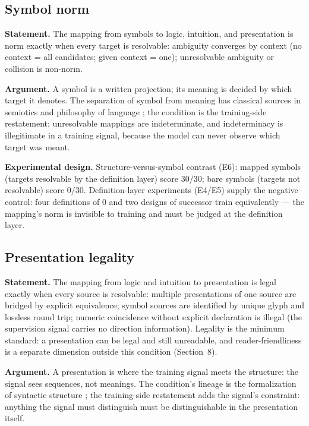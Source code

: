\documentclass{article} %
\begin{document}
\subsection{Symbol norm}

\textbf{Statement.} The mapping from symbols to logic, intuition,
and presentation is norm exactly when every target is resolvable:
ambiguity converges by context (no context = all candidates; given
context = one); unresolvable ambiguity or collision is non-norm.

\textbf{Argument.} A symbol is a written projection; its meaning is
decided by which target it denotes. The separation of symbol from
meaning has classical sources in semiotics and philosophy of
language \citep{frege1892sense, saussure1916course,
peirce1931collected, quine1960word, wittgenstein1953investigations};
the condition is the training-side restatement: unresolvable
mappings are indeterminate, and indeterminacy is illegitimate in a
training signal, because the model can never observe which target
was meant.

\textbf{Experimental design.} Structure-versus-symbol contrast
(E6): mapped symbols (targets resolvable by the definition layer)
score $30/30$; bare symbols (targets not resolvable) score $0/30$.
Definition-layer experiments (E4/E5) supply the negative control:
four definitions of 0 and two designs of successor train
equivalently --- the mapping's norm is invisible to training and
must be judged at the definition layer.

\subsection{Presentation legality}

\textbf{Statement.} The mapping from logic and intuition to
presentation is legal exactly when every source is resolvable:
multiple presentations of one source are bridged by explicit
equivalence; symbol sources are identified by unique glyph and
lossless round trip; numeric coincidence without explicit
declaration is illegal (the supervision signal carries no direction
information). Legality is the minimum standard: a presentation
can be legal and still unreadable, and reader-friendliness is a
separate dimension outside this condition (Section~8).

\textbf{Argument.} A presentation is where the training signal
meets the structure: the signal sees sequences, not meanings. The
condition's lineage is the formalization of syntactic structure
\citep{chomsky1957syntax, chomsky1956three, naur1960algol,
earley1970parsing, aho1972parsing}; the training-side restatement
adds the signal's constraint: anything the signal must distinguish
must be distinguishable in the presentation itself.
\end{document}
